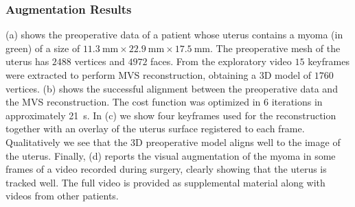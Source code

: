 
\subsubsection{Augmentation Results}
(a) shows the preoperative data of a patient whose uterus contains a myoma (in green) of a size of $\SI{11.3}{\milli\metre}\times\SI{22.9}{\milli\metre}\times\SI{17.5}{\milli\metre}$. The preoperative mesh of the uterus has $2488$ vertices and $4972$ faces. 
From the exploratory video $15$ keyframes were extracted to perform MVS reconstruction, obtaining a 3D model of $1760$ vertices.
(b) shows the successful alignment between the preoperative data and the MVS reconstruction. The cost function  was optimized in $6$ iterations in approximately \SI{21}{\second}. 
In (c) we show four keyframes used for the reconstruction together with an overlay of the uterus surface registered to each frame. Qualitatively we see that the 3D preoperative model aligns well to the image of the uterus.
Finally, (d) reports the visual augmentation of the myoma in some frames of a video recorded during surgery, clearly showing that the uterus is tracked well. 
The full video is provided as supplemental material along with videos from other patients.


